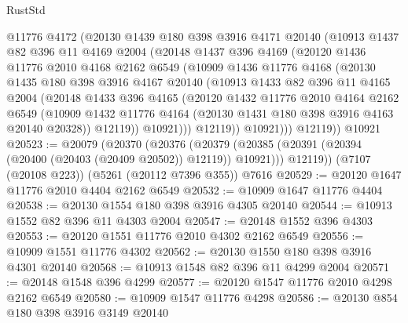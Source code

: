 \begin{lexlean}{RustStd}
\begin{coremodule}
          @11776
          @4172
          (@20130
            @1439
            @180
            @398
            @3916
            @4171
            @20140
            (@10913
              @1437
              @82
              @396
              @11
              @4169
              @2004
              (@20148
                @1437
                @396
                @4169
                (@20120
                  @1436
                  @11776
                  @2010
                  @4168
                  @2162
                  @6549
                  (@10909
                    @1436
                    @11776
                    @4168
                    (@20130
                      @1435
                      @180
                      @398
                      @3916
                      @4167
                      @20140
                      (@10913
                        @1433
                        @82
                        @396
                        @11
                        @4165
                        @2004
                        (@20148
                          @1433
                          @396
                          @4165
                          (@20120
                            @1432
                            @11776
                            @2010
                            @4164
                            @2162
                            @6549
                            (@10909
                              @1432
                              @11776
                              @4164
                              (@20130 @1431 @180 @398 @3916 @4163 @20140 @20328))
                            @12119))
                        @10921)))
                  @12119))
              @10921)))
        @12119))
    @10921
@20523 := @20079
    (@20370
      (@20376
        (@20379 (@20385 (@20391 (@20394 (@20400 (@20403 (@20409 @20502)) @12119)) @10921)))
        @12119))
    (@7107 (@20108 @223))
    (@5261 (@20112 @7396 @355))
    @7616
@20529 := @20120 @1647 @11776 @2010 @4404 @2162 @6549
@20532 := @10909 @1647 @11776 @4404
@20538 := @20130 @1554 @180 @398 @3916 @4305 @20140
@20544 := @10913 @1552 @82 @396 @11 @4303 @2004
@20547 := @20148 @1552 @396 @4303
@20553 := @20120 @1551 @11776 @2010 @4302 @2162 @6549
@20556 := @10909 @1551 @11776 @4302
@20562 := @20130 @1550 @180 @398 @3916 @4301 @20140
@20568 := @10913 @1548 @82 @396 @11 @4299 @2004
@20571 := @20148 @1548 @396 @4299
@20577 := @20120 @1547 @11776 @2010 @4298 @2162 @6549
@20580 := @10909 @1547 @11776 @4298
@20586 := @20130 @854 @180 @398 @3916 @3149 @20140

\end{coremodule}
\end{lexlean}
